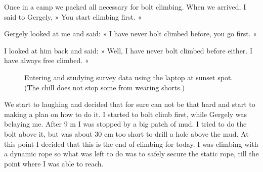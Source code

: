 Once in a camp we packed all necessary for bolt climbing. When we
arrived, I said to Gergely, » You start climbing first. «

Gergely looked
at me and said: » I have never bolt climbed before, you go first. «

I looked at him back and said: » Well, I have never bolt climbed before
either. I have always free climbed. «

\begin{figure}[t!]
\checkoddpage \ifoddpage \forcerectofloat \else \forceversofloat \fi
\centering
 \caption{Entering and studying survey data using the laptop at sunset spot. (The chill does not stop some from wearing shorts.) }
 \label{dan jarv data}
\end{figure}

We start to laughing and decided that for sure can not be that hard and start to making a plan on how to do it. I started to bolt climb first, while Gergely was belaying me. After 9 m I was stopped by a big patch of mud. I tried to do the bolt above it, but was about 30 cm too short to drill a hole above the mud. At this point I decided that this is the end of climbing for today. I was climbing with a dynamic rope so what was left to do was to safely secure the static rope, till the point where I was able to reach.

